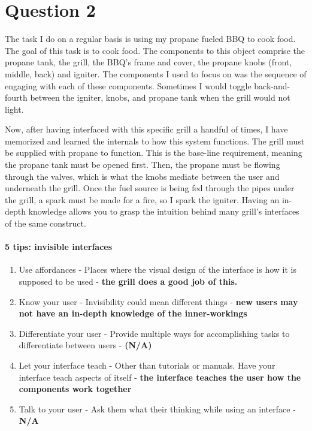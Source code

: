 \section{Question 2}

The task I do on a regular basis is using my propane fueled BBQ to cook food. The goal of this task is to cook food. The components to this object comprise the propane tank, the grill, the BBQ's frame and cover, the propane knobs (front, middle, back) and igniter. The components I used to focus on was the sequence of engaging with each of these components. Sometimes I would toggle back-and-fourth between the igniter, knobs, and propane tank when the grill would not light.

Now, after having interfaced with this specific grill a handful of times, I have memorized and learned the internals to how this system functions. The grill must be supplied with propane to function. This is the base-line requirement, meaning the propane tank must be opened first. Then, the propane must be flowing through the valves, which is what the knobs mediate between the user and underneath the grill. Once the fuel source is being fed through the pipes under the grill, a spark must be made for a fire, so I spark the igniter. Having an in-depth knowledge allows you to grasp the intuition behind many grill's interfaces of the same construct.

\paragraph{5 tips: invisible interfaces}
\begin{enumerate}
\item
  Use affordances - Places where the visual design of the interface is how it is supposed to be used - \textbf{the grill does a good job of this.}
\item
  Know your user - Invisibility could mean different things - \textbf{new users may not have an in-depth knowledge of the inner-workings}
\item
  Differentiate your user - Provide multiple ways for accomplishing tasks to differentiate between users - \textbf{(N/A)}
\item
  Let your interface teach - Other than tutorials or manuals. Have your interface teach aspects of itself - \textbf{the interface teaches the user how the components work together}
\item
  Talk to your user - Ask them what their thinking while using an interface - \textbf{N/A}
\end{enumerate}

